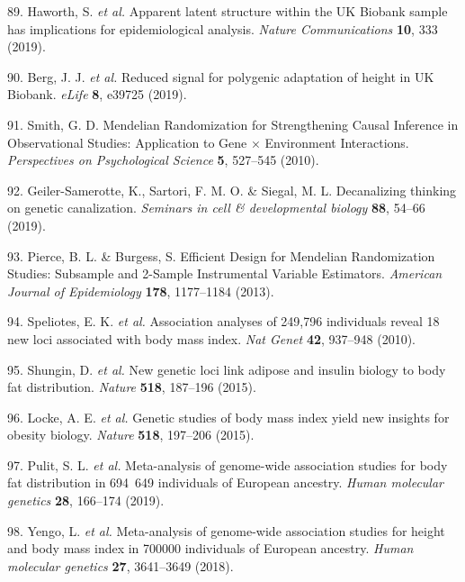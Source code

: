 \documentclass[11pt,twoside]{bristolthesis}
\begin{document}
\leavevmode\hypertarget{ref-Haworth2019}{}%
89. Haworth, S. \emph{et al.} Apparent latent structure within the UK Biobank sample has implications for epidemiological analysis. \emph{Nature Communications} \textbf{10}, 333 (2019).

\leavevmode\hypertarget{ref-Berg2019}{}%
90. Berg, J. J. \emph{et al.} Reduced signal for polygenic adaptation of height in UK Biobank. \emph{eLife} \textbf{8}, e39725 (2019).

\leavevmode\hypertarget{ref-Smith2010}{}%
91. Smith, G. D. Mendelian Randomization for Strengthening Causal Inference in Observational Studies: Application to Gene × Environment Interactions. \emph{Perspectives on Psychological Science} \textbf{5}, 527--545 (2010).

\leavevmode\hypertarget{ref-Geiler-Samerotte2019}{}%
92. Geiler-Samerotte, K., Sartori, F. M. O. \& Siegal, M. L. Decanalizing thinking on genetic canalization. \emph{Seminars in cell \& developmental biology} \textbf{88}, 54--66 (2019).

\leavevmode\hypertarget{ref-Pierce2013}{}%
93. Pierce, B. L. \& Burgess, S. Efficient Design for Mendelian Randomization Studies: Subsample and 2-Sample Instrumental Variable Estimators. \emph{American Journal of Epidemiology} \textbf{178}, 1177--1184 (2013).

\leavevmode\hypertarget{ref-Speliotes2010a}{}%
94. Speliotes, E. K. \emph{et al.} Association analyses of 249,796 individuals reveal 18 new loci associated with body mass index. \emph{Nat Genet} \textbf{42}, 937--948 (2010).

\leavevmode\hypertarget{ref-Shungin2015}{}%
95. Shungin, D. \emph{et al.} New genetic loci link adipose and insulin biology to body fat distribution. \emph{Nature} \textbf{518}, 187--196 (2015).

\leavevmode\hypertarget{ref-Locke2015}{}%
96. Locke, A. E. \emph{et al.} Genetic studies of body mass index yield new insights for obesity biology. \emph{Nature} \textbf{518}, 197--206 (2015).

\leavevmode\hypertarget{ref-Pulit2019}{}%
97. Pulit, S. L. \emph{et al.} Meta-analysis of genome-wide association studies for body fat distribution in 694~649 individuals of European ancestry. \emph{Human molecular genetics} \textbf{28}, 166--174 (2019).

\leavevmode\hypertarget{ref-Yengo2018}{}%
98. Yengo, L. \emph{et al.} Meta-analysis of genome-wide association studies for height and body mass index in 700000 individuals of European ancestry. \emph{Human molecular genetics} \textbf{27}, 3641--3649 (2018).
\end{document}
